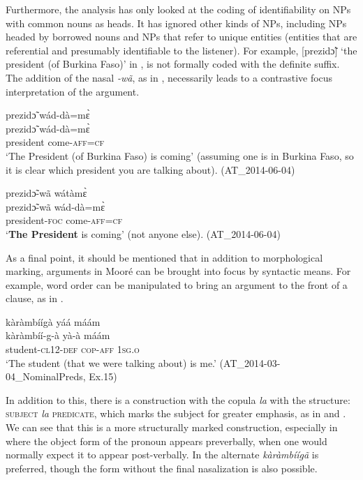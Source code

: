 \documentclass[output=paper]{langsci/langscibook}
\begin{document}
Furthermore, the analysis has only looked at the coding of identifiability on NPs with common nouns as heads. It has ignored other kinds of NPs, including NPs headed by borrowed nouns and NPs that refer to unique entities (entities that are referential and presumably identifiable to the listener). For example, [prezid\~{ɔ}] ‘the president (of Burkina Faso)’ in , is not formally coded with the definite suffix. The addition of the nasal \textit{-wã}, as in , necessarily leads to a contrastive focus interpretation of the argument.

\ea\label{ex:teo:60}
\glll prezid\~{ɔ} wád-dà=m\`ɛ \\
prezid\~{ɔ} wád-dà=m\`ɛ \\
president come\textsc{-aff=cf}\\
\glt ‘The President (of Burkina Faso) is coming’ (assuming one is in Burkina Faso, so it is clear which president you are talking about). (AT\_2014-06-04)
\z

\ea\label{ex:teo:61}
\glll prezid\~{ɔ}-wã wátàm\`ɛ\\
prezid\~{ɔ}-wã wád-dà=m\`ɛ\\
president-\textsc{foc} come\textsc{-aff=cf}\\
\glt ‘\textbf{The President} is coming’ (not anyone else). (AT\_2014-06-04)
\z

As a final point, it should be mentioned that in addition to morphological marking, arguments in Mooré can be brought into focus by syntactic means. For example, word order can be manipulated to bring an argument to the front of a clause, as in .

\ea\label{ex:teo:62}
\glll kàràmbíígà yáá máám\\
kàràmbíí-g-à yà-à máám\\
student-\textsc{cl12-def} \textsc{cop-aff} \textsc{1sg.o}\\
\glt ‘The student (that we were talking about) is me.’ (AT\_2014-03-04\_NominalPreds, Ex.15)
\z

In addition to this, there is a construction with the copula \textit{la} with the structure: \textsc{subject} \textit{la} \textsc{predicate}, which marks the subject for greater emphasis, as in  and . We can see that this is a more structurally marked construction, especially in  where the object form of the pronoun appears preverbally, when one would normally expect it to appear post-verbally. In  the alternate \textit{kàràmbíígã} is preferred, though the form without the final nasalization is also possible. 
\end{document}

